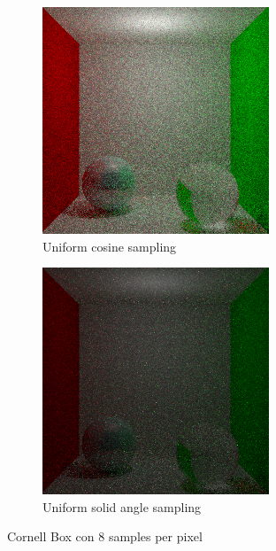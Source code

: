 \documentclass{article}
\begin{document}
\begin{figure}
\begin{subfigure}[h]{0.4\linewidth}
\includegraphics[width=\linewidth]{imgs/cosine_box8.png}
\caption{Uniform cosine sampling}
\end{subfigure}
\hfill
\begin{subfigure}[h]{0.4\linewidth}
\includegraphics[width=\linewidth]{imgs/solid_angle_box8.png}
\caption{Uniform solid angle sampling}
\end{subfigure}%
\caption{Cornell Box con 8 samples per pixel}
\end{figure}
\end{document}
